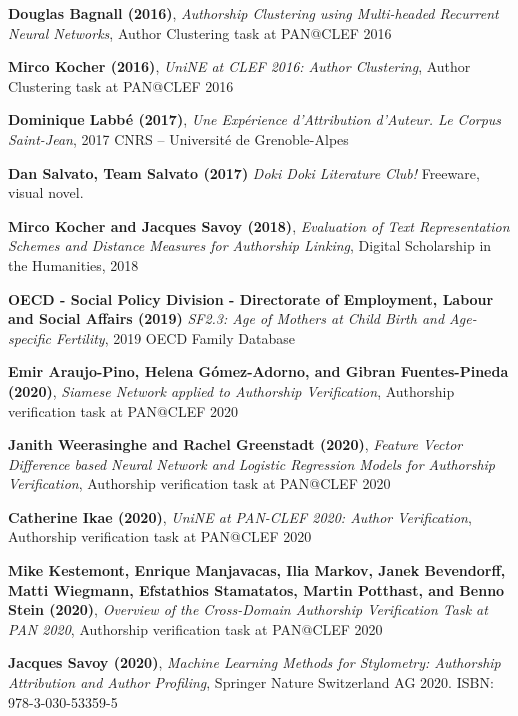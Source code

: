 \begin{thebibliography}{9}
\textbf{Douglas Bagnall (2016)},
\textit{Authorship Clustering using Multi-headed Recurrent Neural Networks},
Author Clustering task at PAN@CLEF 2016

\textbf{Mirco Kocher (2016)},
\textit{UniNE at CLEF 2016: Author Clustering},
Author Clustering task at PAN@CLEF 2016

\textbf{Dominique Labbé (2017)},
\textit{Une Expérience d’Attribution d’Auteur. Le Corpus Saint-Jean},
2017 CNRS – Université de Grenoble-Alpes

\textbf{Dan Salvato, Team Salvato (2017)}
\textit{Doki Doki Literature Club!}
Freeware, visual novel.

\textbf{Mirco Kocher and Jacques Savoy (2018)},
\textit{Evaluation of Text Representation Schemes and Distance Measures for Authorship Linking},
Digital Scholarship in the Humanities, 2018

\textbf{OECD - Social Policy Division - Directorate of Employment, Labour and Social Affairs (2019)}
\textit{SF2.3: Age of Mothers at Child Birth and Age-specific Fertility},
2019 OECD Family Database

\textbf{Emir Araujo-Pino, Helena Gómez-Adorno, and Gibran Fuentes-Pineda (2020)},
\textit{Siamese Network applied to Authorship Verification},
Authorship verification task at PAN@CLEF 2020

\textbf{Janith Weerasinghe and Rachel Greenstadt (2020)},
\textit{Feature Vector Difference based Neural Network and Logistic Regression Models for Authorship Verification},
Authorship verification task at PAN@CLEF 2020

\textbf{Catherine Ikae (2020)},
\textit{UniNE at PAN-CLEF 2020: Author Verification},
Authorship verification task at PAN@CLEF 2020

\textbf{Mike Kestemont, Enrique Manjavacas, Ilia Markov, Janek Bevendorff, Matti Wiegmann, Efstathios Stamatatos, Martin Potthast, and Benno Stein (2020)},
\textit{Overview of the Cross-Domain Authorship Verification Task at PAN 2020},
Authorship verification task at PAN@CLEF 2020

\textbf{Jacques Savoy (2020)},
\textit{Machine Learning Methods for Stylometry: Authorship Attribution and Author Profiling},
Springer Nature Switzerland AG 2020. ISBN: 978-3-030-53359-5


\end{thebibliography}
